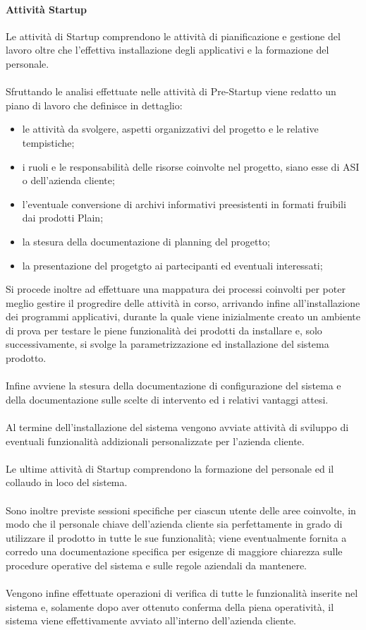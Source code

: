 \paragraph{Attività Startup}
Le attività di Startup comprendono le attività di pianificazione e gestione del lavoro oltre che l'effettiva installazione degli applicativi e la formazione del personale.
\\\\
Sfruttando le analisi effettuate nelle attività di Pre-Startup viene redatto un piano di lavoro che definisce in dettaglio:
\begin{itemize}
	\item le attività da svolgere, aspetti organizzativi del progetto e le relative tempistiche;
	\item i ruoli e le responsabilità delle risorse coinvolte nel progetto, siano esse di ASI o dell'azienda cliente;
	\item l'eventuale conversione di archivi informativi preesistenti in formati fruibili dai prodotti Plain;
	\item la stesura della documentazione di planning del progetto;
	\item la presentazione del progetgto ai partecipanti ed eventuali interessati;
\end{itemize}
Si procede inoltre ad effettuare una mappatura dei processi coinvolti per poter meglio gestire il progredire delle attività in corso, arrivando infine all'installazione dei programmi applicativi, durante la quale viene inizialmente creato un ambiente di prova per testare le piene funzionalità dei prodotti da installare e, solo successivamente, si svolge la parametrizzazione ed installazione del sistema prodotto.
\\\\
Infine avviene la stesura della documentazione di configurazione del sistema e della documentazione sulle scelte di intervento ed i relativi vantaggi attesi.
\\\\
Al termine dell'installazione del sistema vengono avviate attività di sviluppo di eventuali funzionalità addizionali personalizzate per l'azienda cliente.
\\\\
Le ultime attività di Startup comprendono la formazione del personale ed il collaudo in loco del sistema.
\\\\
Sono inoltre previste sessioni specifiche per ciascun utente delle aree coinvolte, in modo che il personale chiave dell'azienda cliente sia perfettamente in grado di utilizzare il prodotto in tutte le sue funzionalità; viene eventualmente fornita a corredo una documentazione specifica per esigenze di maggiore chiarezza sulle procedure operative del sistema e sulle regole aziendali da mantenere.
\\\\
Vengono infine effettuate operazioni di verifica di tutte le funzionalità inserite nel sistema e, solamente dopo aver ottenuto conferma della piena operatività, il sistema viene effettivamente avviato all'interno dell'azienda cliente.

